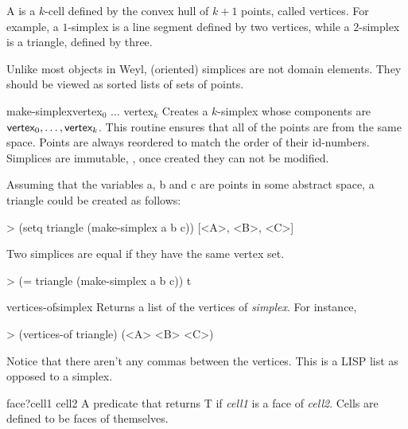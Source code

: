 A  is a $k$-cell defined by the convex hull of $k+1$
points, called vertices.  For example, a $1$-simplex is a line segment
defined by two vertices, while a $2$-simplex is a triangle, defined by
three. 

Unlike most objects in Weyl, (oriented) simplices are not domain
elements. They should be viewed as sorted lists of sets of points.
  
\begin{functiondef}{make-simplex}{vertex$_0$ $\ldots$ vertex$_k$}
Creates a $k$-simplex whose components are $\mbox{\sf vertex}_0,
\ldots, \mbox{\sf vertex}_k$. This routine ensures that all of the
points are from the same space.  Points are always reordered to match
the order of their id-numbers.  Simplices are immutable, \ie, once
created they can not be modified.
\end{functiondef}
  
Assuming that the variables {\sf a}, {\sf b} and {\sf c} are points in
some abstract space, a triangle could be created as follows:
 
\begin{code}
> (setq triangle (make-simplex a b c))
[<A>, <B>, <C>]
\end{code}

\noindent
Two simplices are equal if they have the same vertex set.
  
\begin{code}
> (= triangle (make-simplex a b c))
t
\end{code}
  
\begin{functiondef}{vertices-of}{simplex}
Returns a list of the vertices of {\em simplex}.  For instance,
\begin{code} 
> (vertices-of triangle)
(<A> <B> <C>)
\end{code}
\end{functiondef}
  
Notice that there aren't any commas between the vertices. This is a
LISP list as opposed to a simplex.
  
\begin{methoddef}{face?}{cell1 cell2}
A predicate that returns {\sf T} if {\em cell1} is a face of {\em
cell2}.  Cells are defined to be faces of themselves.
\end{methoddef}

